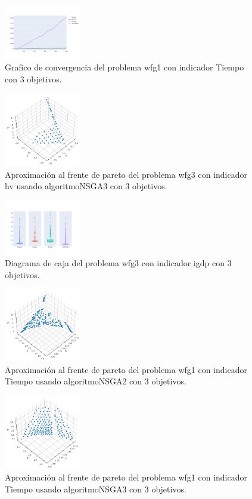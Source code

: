 \documentclass{article}
\begin{document}
\clearpage
\begin{figure}
	\includegraphics[width=0.3\textwidth]{wfg1_Tiempo_3_gc.png}
	\caption{Grafico de convergencia del problema wfg1 con indicador Tiempo con 3 objetivos.}
\end{figure}
\begin{figure}
	\includegraphics[width=0.3\textwidth]{NSGA3_wfg3_hv_3_fp.png}
	\caption{Aproximación al frente de pareto del problema wfg3 con indicador hv usando algoritmoNSGA3 con 3 objetivos.}
\end{figure}
\begin{figure}
	\includegraphics[width=0.3\textwidth]{wfg3_igdp_3_bp.png}
	\caption{Diagrama de caja del problema wfg3 con indicador igdp con 3 objetivos.}
\end{figure}
\clearpage
\begin{figure}
	\includegraphics[width=0.3\textwidth]{NSGA2_wfg1_Tiempo_3_fp.png}
	\caption{Aproximación al frente de pareto del problema wfg1 con indicador Tiempo usando algoritmoNSGA2 con 3 objetivos.}
\end{figure}
\begin{figure}
	\includegraphics[width=0.3\textwidth]{NSGA3_wfg1_Tiempo_3_fp.png}
	\caption{Aproximación al frente de pareto del problema wfg1 con indicador Tiempo usando algoritmoNSGA3 con 3 objetivos.}
\end{figure}
\end{document}
